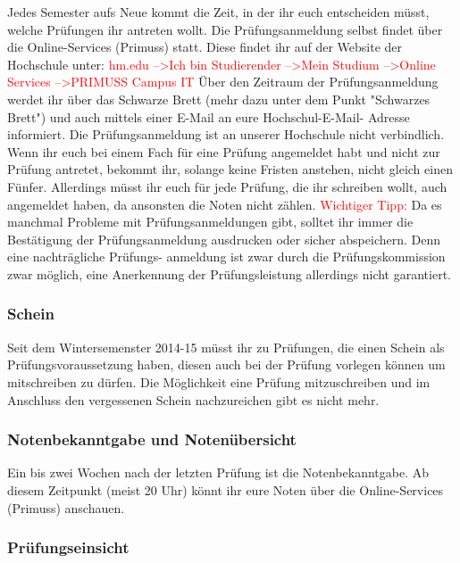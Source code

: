 Jedes Semester aufs Neue kommt die Zeit, in der ihr euch entscheiden müsst, welche Prüfungen ihr antreten wollt.\doublebreak
Die Prüfungsanmeldung selbst findet über die Online-Services (Primuss) statt. Diese findet ihr auf der Website der Hochschule unter:\doublebreak
\textcolor{red}{hm.edu --\textgreater Ich bin Studierender --\textgreater Mein Studium --\textgreater Online Services  --\textgreater PRIMUSS Campus IT}\doublebreak
Über den Zeitraum der Prüfungsanmeldung werdet ihr über das Schwarze Brett (mehr dazu unter dem Punkt "Schwarzes Brett") und auch mittels einer E-Mail an eure Hochschul-E-Mail- Adresse informiert.\doublebreak
Die Prüfungsanmeldung ist an unserer Hochschule nicht verbindlich. Wenn ihr euch bei einem Fach für eine Prüfung angemeldet habt und nicht zur Prüfung antretet, bekommt ihr, solange keine Fristen anstehen, nicht gleich einen Fünfer. Allerdings müsst ihr euch für jede Prüfung, die ihr schreiben wollt, auch angemeldet haben, da ansonsten die Noten nicht zählen.\doublebreak 
\textcolor{red}{Wichtiger Tipp:} Da es manchmal Probleme mit Prüfungsanmeldungen gibt, solltet ihr immer die Bestätigung der Prüfungsanmeldung ausdrucken oder sicher abspeichern. Denn eine nachträgliche Prüfungs- anmeldung ist zwar durch die Prüfungskommission zwar möglich, eine Anerkennung der Prüfungsleistung allerdings nicht garantiert.

\subsubsection{Schein}
Seit dem Wintersemenster 2014-15 müsst ihr zu Prüfungen, die einen Schein als Prüfungsvoraussetzung haben, diesen auch bei der Prüfung vorlegen können um mitschreiben zu dürfen. Die Möglichkeit eine Prüfung mitzuschreiben und im Anschluss den vergessenen Schein nachzureichen gibt es nicht mehr.

\subsubsection{Notenbekanntgabe und Notenübersicht}

Ein bis zwei Wochen nach der letzten Prüfung ist die Notenbekanntgabe. Ab diesem Zeitpunkt (meist 20 Uhr) könnt ihr eure Noten über die Online-Services (Primuss) anschauen.

\subsubsection{Prüfungseinsicht}

